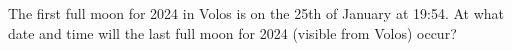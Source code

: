 The first full moon for 2024 in Volos is on the 25th of January at 19:54. At what date and time will the
last full moon for 2024 (visible from Volos) occur?
